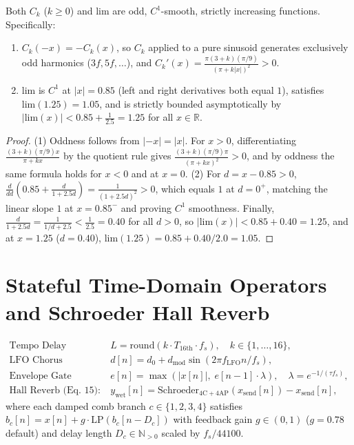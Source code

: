 \begin{theorem}
\label{thm:nonlin-bounds}
Both $C_k$ ($k \ge 0$) and $\mathrm{lim}$ are odd, $C^1$-smooth, strictly increasing functions. Specifically:
\begin{enumerate}[leftmargin=1.5em]
  \item $C_k(-x) = -C_k(x)$, so $C_k$ applied to a pure sinusoid generates exclusively odd harmonics ($3f, 5f, \dots$), and $C_k'(x) = \frac{\pi(3+k)(\pi/9)}{(\pi + k|x|)^2} > 0$.
  \item $\mathrm{lim}$ is $C^1$ at $|x| = 0.85$ (left and right derivatives both equal $1$), satisfies $\mathrm{lim}(1.25) = 1.05$, and is strictly bounded asymptotically by $|\mathrm{lim}(x)| < 0.85 + \frac{1}{2.5} = 1.25$ for all $x \in \mathbb{R}$.
\end{enumerate}
\end{theorem}

\begin{proof}
(1) Oddness follows from $|{-x}| = |x|$. For $x > 0$, differentiating $\frac{(3+k)(\pi/9)x}{\pi + kx}$ by the quotient rule gives $\frac{(3+k)(\pi/9)\pi}{(\pi + kx)^2} > 0$, and by oddness the same formula holds for $x < 0$ and at $x = 0$.
(2) For $d = x - 0.85 > 0$, $\frac{d}{dd}\!\left(0.85 + \frac{d}{1+2.5d}\right) = \frac{1}{(1+2.5d)^2} > 0$, which equals $1$ at $d = 0^+$, matching the linear slope $1$ at $x = 0.85^-$ and proving $C^1$ smoothness. Finally, $\frac{d}{1 + 2.5d} = \frac{1}{1/d + 2.5} < \frac{1}{2.5} = 0.40$ for all $d > 0$, so $|\mathrm{lim}(x)| < 0.85 + 0.40 = 1.25$, and at $x = 1.25$ ($d = 0.40$), $\mathrm{lim}(1.25) = 0.85 + 0.40/2.0 = 1.05$.
\end{proof}

\section{Stateful Time-Domain Operators and Schroeder Hall Reverb}

\begin{definition}
\begin{align}
\text{Tempo Delay (Eq.~16):}\quad & L = \mathrm{round}(k \cdot T_{\mathrm{16th}} \cdot f_s), \quad k \in \{1,\dots,16\}, \\
\text{LFO Chorus (Eq.~17):}\quad & d[n] = d_0 + d_{\mathrm{mod}}\sin(2\pi f_{\mathrm{LFO}} n / f_s), \\
\text{Envelope Gate (Eq.~18):}\quad & e[n] = \max(|x[n]|,\; e[n-1]\cdot \lambda), \quad \lambda = e^{-1/(\tau f_s)}, \\
\text{Hall Reverb (Eq.~15):}\quad & y_{\mathrm{wet}}[n] = \mathrm{Schroeder}_{4\text{C}+4\text{AP}}(x_{\mathrm{send}}[n]) - x_{\mathrm{send}}[n],
\end{align}
where each damped comb branch $c \in \{1,2,3,4\}$ satisfies $b_c[n] = x[n] + g \cdot \mathrm{LP}(b_c[n - D_c])$ with feedback gain $g \in (0, 1)$ ($g = 0.78$ default) and delay length $D_c \in \mathbb{N}_{>0}$ scaled by $f_s / 44100$.
\end{definition}

